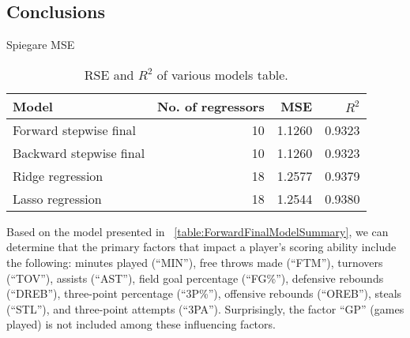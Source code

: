 \subsection{Conclusions}

Spiegare MSE

\begin{table}[H]
	\centering
	\begin{tabular}{|| l | r | r | r ||} 
		\hline
		Model & No. of regressors & MSE & $R^2$ \\
		\hline
		Forward stepwise final & 10 & 1.1260 & 0.9323 \\
		\hline
		Backward stepwise final & 10 & 1.1260 & 0.9323 \\
		\hline
		Ridge regression & 18 & 1.2577 & 0.9379 \\
		\hline
		Lasso regression & 18 & 1.2544 & 0.9380 \\
		\hline
	\end{tabular}
	\caption{RSE and $R^2$ of various models table.}
	\label{table:RegEvalParams}
\end{table}

Based on the model presented in \Tab~\ref{table:ForwardFinalModelSummary}, we can determine that the primary factors that impact a player's scoring ability include the following: minutes played (``MIN''), free throws made (``FTM''), turnovers (``TOV''), assists (``AST''), field goal percentage (``FG\%''), defensive rebounds (``DREB''), three-point percentage (``3P\%''), offensive rebounds (``OREB''), steals (``STL''), and three-point attempts (``3PA'').
Surprisingly, the factor ``GP'' (games played) is not included among these influencing factors.